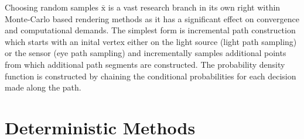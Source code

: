 Choosing random samples $\bar{\mathrm{x}}$ is a vast research branch in its own right within Monte-Carlo based rendering methods as it has a significant effect on convergence and computational demands. The simplest form is incremental path construction which starts with an inital vertex either on the light source (light path sampling) or the sensor (eye path sampling) and incrementally samples additional points from which additional path segments are constructed. The probability density function is constructed by chaining the conditional probabilities for each decision made along the path.


\section{Deterministic Methods}
\label{sec:foundations_deterministic}

